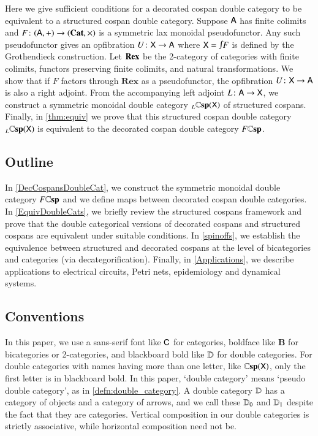 \documentclass[reqno]{amsart}
\begin{document}
Here we give sufficient conditions for a decorated cospan double category to be equivalent to a structured cospan double category.  Suppose $\mathsf{A}$ has finite colimits and $F \colon (\mathsf{A} , +) \to (\mathbf{Cat}, \times)$ is a symmetric lax monoidal pseudofunctor.   Any such pseudofunctor gives an opfibration $U \colon \mathsf{X} \to \mathsf{A}$ where $\X = \inta F$ is defined by the Grothendieck construction.  Let $\mathbf{Rex}$ be the 2-category of categories with finite colimits, functors preserving finite colimits, and natural transformations.  We show that if $F$ factors through $\mathbf{Rex}$ as a pseudofunctor, the opfibration $U \colon \mathsf{X} \to \mathsf{A}$ is also a right adjoint.  From the accompanying left adjoint $L \colon \mathsf{A} \to \mathsf{X}$, we  construct a symmetric monoidal double category ${}_L \mathbf{\mathbb Csp}(\mathsf{X})$ of structured cospans.  Finally, in \cref{thm:equiv} we prove that this structured cospan double category ${}_L \mathbf{\mathbb Csp}(\mathsf{X})$ is equivalent to the decorated cospan double category $F \mathbf{\mathbb Csp}$. 

\subsection*{Outline}

In \cref{DecCospansDoubleCat}, we construct the symmetric monoidal double category $F\mathbf{\mathbb Csp}$ and we define maps between decorated cospan double categories. In \cref{EquivDoubleCats}, we briefly review the structured cospans framework and prove that the double categorical versions of decorated cospans and structured cospans are equivalent under suitable conditions. In \cref{spinoffs}, we establish the equivalence between structured and decorated cospans at the level of bicategories and categories (via decategorification).
Finally, in \cref{Applications}, we describe applications to electrical circuits, Petri nets, epidemiology and dynamical systems.

\subsection*{Conventions}

In this paper, we use a sans-serif font like $\mathsf{C}$ for categories, boldface like $\mathbf{B}$ for bicategories or 2-categories, and blackboard bold like $\mathbf{\mathbb D}$ for double categories. For double categories with names having more than one letter, like $\mathbf{\mathbb Csp}(\mathsf{X})$, only the first letter is in blackboard bold. In this paper, `double category' means `pseudo double category', as in \cref{defn:double_category}. A double category $\mathbf{\mathbb D}$ has a category of objects and a category of arrows, and we call these $\mathbf{\mathbb D}_0$ and $\mathbf{\mathbb D}_1$ despite the fact that they are categories. Vertical composition in our double categories is strictly associative, while horizontal composition need not be. 
\end{document}
